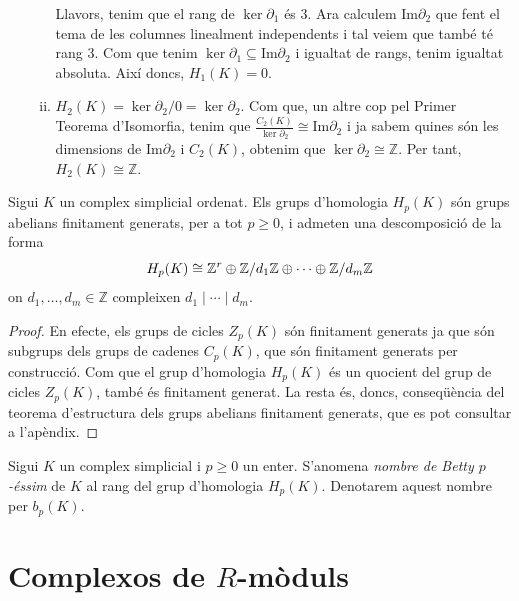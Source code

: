 \documentclass[../main.tex]{subfiles}
\begin{document}
\begin{ej}
\begin{enumerate}[(1)]
\begin{enumerate}[(i)]
        Llavors, tenim que el rang de $\ker\partial_1$ és 3. Ara calculem $\mathrm{Im}\partial_2$ que fent el tema de les columnes linealment independents i tal veiem que també té rang 3. Com que tenim $\ker\partial_1\subseteq\mathrm{Im}\partial_2$ i igualtat de rangs, tenim igualtat absoluta. Així doncs, $H_1(K) = 0$.
        
        \item $H_2(K) = \ker\partial_2/0 = \ker\partial_2$. Com que, un altre cop pel Primer Teorema d'Isomorfia, tenim que $\frac{C_2(K)}{\ker\partial_2}\cong\mathrm{Im}\partial_2$ i ja sabem quines són les dimensions de $\mathrm{Im}\partial_2$ i $C_2(K)$, obtenim que $\ker\partial_2\cong \mathbb{Z}$. Per tant, $H_2(K)\cong\mathbb{Z}$.
    \end{enumerate}
\end{enumerate}
\end{ej}

\begin{prop}
\label{prop:grupsdhomologia} Sigui $K$ un complex simplicial ordenat. Els grups d'homologia $H_p(K)$ són grups abelians finitament generats, per a tot $p\geq 0$, i admeten una descomposició de la forma
\begin{equation}
    \notag
    H_p(K)\cong\mathbb{Z}^r\oplus \mathbb{Z}/d_1\mathbb{Z}\oplus\cdots\oplus\mathbb{Z}/d_m\mathbb{Z}
\end{equation}
on $d_1,\ldots,d_m\in\mathbb{Z}$ compleixen $d_1\mid\cdots\mid d_m$.
\end{prop}
\begin{proof}
En efecte, els grups de cicles $Z_p(K)$ són finitament generats ja que són subgrups dels grups de cadenes $C_p(K)$, que són finitament generats per construcció. Com que el grup d'homologia $H_p(K)$ és un quocient del grup de cicles $Z_p(K)$, també és finitament generat. La resta és, doncs, conseqüència del teorema d'estructura dels grups abelians finitament generats, que es pot consultar a l'apèndix.
\end{proof}

\begin{defi}
\label{def:nombrebetty} Sigui $K$ un complex simplicial i $p\geq 0$ un enter. S'anomena \textit{nombre de Betty $p$-éssim} de $K$ al rang del grup d'homologia $H_p(K)$. Denotarem aquest nombre per $b_p(K)$.
\end{defi}



\section{Complexos de $R$-m\`oduls}
\end{document}
